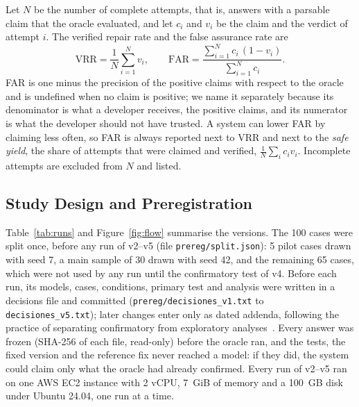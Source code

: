 \documentclass[ai,article,submit,oneauthor]{Definitions/mdpi}
\begin{document}
Let $N$ be the number of complete attempts, that is, answers with a parsable claim that the oracle evaluated, and let $c_i$ and $v_i$ be the claim and the verdict of attempt $i$. The verified repair rate and the false assurance rate are
\begin{equation}
\mathrm{VRR}=\frac{1}{N}\sum_{i=1}^{N} v_i, \qquad
\mathrm{FAR}=\frac{\sum_{i=1}^{N} c_i\,(1-v_i)}{\sum_{i=1}^{N} c_i}.
\label{eq:metrics}
\end{equation}
FAR is one minus the precision of the positive claims with respect to the oracle and is undefined when no claim is positive; we name it separately because its denominator is what a developer receives, the positive claims, and its numerator is what the developer should not have trusted. A system can lower FAR by claiming less often, so FAR is always reported next to VRR and next to the \emph{safe yield}, the share of attempts that were claimed and verified, $\frac{1}{N}\sum_i c_i v_i$. Incomplete attempts are excluded from $N$ and listed.

\subsection{Study Design and Preregistration}\label{sec:design}

Table~\ref{tab:runs} and Figure~\ref{fig:flow} summarise the versions. The 100 cases were split once, before any run of v2--v5 (file \texttt{prereg/split.json}): 5 pilot cases drawn with seed 7, a main sample of 30 drawn with seed 42, and the remaining 65 cases, which were not used by any run until the confirmatory test of v4. Before each run, its models, cases, conditions, primary test and analysis were written in a decisions file and committed (\texttt{prereg/decisiones\_v1.txt} to \texttt{decisiones\_v5.txt}); later changes enter only as dated addenda, following the practice of separating confirmatory from exploratory analyses~\cite{Nosek2018PreregistrationRevolution}. Every answer was frozen (SHA-256 of each file, read-only) before the oracle ran, and the tests, the fixed version and the reference fix never reached a model: if they did, the system could claim only what the oracle had already confirmed. Every run of v2--v5 ran on one AWS EC2 instance with 2 vCPU, 7~GiB of memory and a 100~GB disk under Ubuntu 24.04, one run at a time.
\end{document}
